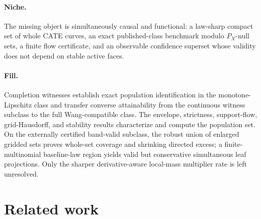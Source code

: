 \documentclass{article}
\begin{document}
\paragraph{Niche.} The missing object is simultaneously causal and functional: a law-sharp compact set of whole CATE curves, an exact published-class benchmark modulo \(P_X\)-null sets, a finite flow certificate, and an observable confidence superset whose validity does not depend on stable active faces.

\paragraph{Fill.} Completion witnesses establish exact population identification in the monotone-Lipschitz class and transfer converse attainability from the continuous witness subclass to the full Wang-compatible class. The envelope, strictness, support-flow, grid-Hausdorff, and stability results characterize and compute the population set. On the externally certified band-valid subclass, the robust union of enlarged gridded sets proves whole-set coverage and shrinking directed excess; a finite-multinomial baseline-law region yields valid but conservative simultaneous leaf projections. Only the sharper derivative-aware local-mass multiplier rate is left unresolved.

\section{Related work}
\end{document}
